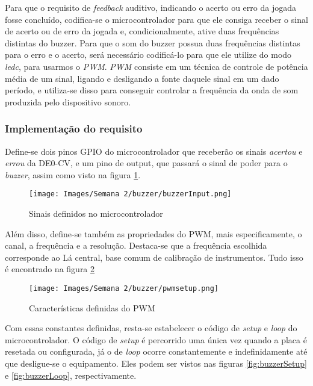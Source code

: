\documentclass[amsmath,amssymb,floatfix]{report}
\begin{document}
Para que o requisito de \textit{feedback} auditivo, indicando o acerto ou erro da jogada fosse concluído, codifica-se o microcontrolador para que ele consiga receber o sinal de acerto ou de erro da jogada e, condicionalmente, ative duas frequências distintas do buzzer. Para que o som do buzzer possua duas frequências distintas para o erro e o acerto, será necessário codificá-lo para que ele utilize do modo \textit{ledc}, para usarmos o \textit{PWM}. \textit{PWM} consiste em um técnica de controle de potência média de um sinal, ligando e desligando a fonte daquele sinal em um dado período, e utiliza-se disso para conseguir controlar a frequência da onda de som produzida pelo dispositivo sonoro.

\subsubsection{Implementação do requisito}
\label{subsubsec:buzzerimplementation2}
Define-se dois pinos GPIO do microcontrolador que receberão os sinais \textit{acertou} e \textit{errou} da DE0-CV, e um pino de output, que passará o sinal de poder para o \textit{buzzer}, assim como visto na figura \ref{fig:arduinosignal}. 

\begin{figure}[H]
    \centering
    \texttt{[image: Images/Semana 2/buzzer/buzzerInput.png]}
    \caption{Sinais definidos no microcontrolador}
    \label{fig:arduinosignal}
\end{figure}

Além disso, define-se também as propriedades do PWM, mais especificamente, o canal, a frequência e a resolução. Destaca-se que a frequência escolhida corresponde ao Lá central, base comum de calibração de instrumentos. Tudo isso é encontrado na figura \ref{fig:pwmSetup}

\begin{figure}[H]
    \centering
    \texttt{[image: Images/Semana 2/buzzer/pwmsetup.png]}
    \caption{Características definidas do PWM}
    \label{fig:pwmSetup}
\end{figure}

Com essas constantes definidas, resta-se estabelecer o código de \textit{setup} e \textit{loop} do microcontrolador. O código de \textit{setup} é percorrido uma única vez quando a placa é resetada ou configurada, já o de \textit{loop} ocorre constantemente e indefinidamente até que desligue-se o equipamento. Eles podem ser vistos nas figuras \ref{fig:buzzerSetup} e \ref{fig:buzzerLoop}, respectivamente.
\end{document}
